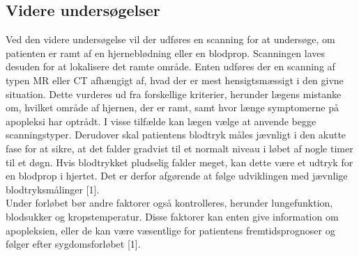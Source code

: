 \subsection{Videre undersøgelser}
Ved den videre undersøgelse vil der udføres en scanning for at undersøge, om patienten er ramt af en hjerneblødning  eller en blodprop. Scanningen laves desuden for at lokalisere det ramte område. Enten udføres der en scanning af typen MR eller CT afhængigt af, hvad der er mest hensigtsmæssigt i den givne situation. Dette vurderes ud fra forskellige kriterier, herunder lægens mistanke om, hvilket område af hjernen, der er ramt, samt hvor længe symptomerne på apopleksi har optrådt. I visse tilfælde kan lægen vælge at anvende begge scanningstyper.  
Derudover skal patientens blodtryk måles jævnligt i den akutte fase for at sikre, at det falder gradvist til et normalt niveau i løbet af nogle timer til et døgn. Hvis blodtrykket pludselig falder meget, kan dette være et udtryk for en blodprop i hjertet. Det er derfor afgørende at følge udviklingen med jævnlige blodtryksmålinger [1].
\\
Under forløbet bør andre faktorer også kontrolleres, herunder lungefunktion, blodsukker og kropstemperatur. Disse faktorer kan enten give information om apopleksien, eller de kan være væsentlige for patientens fremtidsprognoser og følger efter sygdomsforløbet [1].
\\

